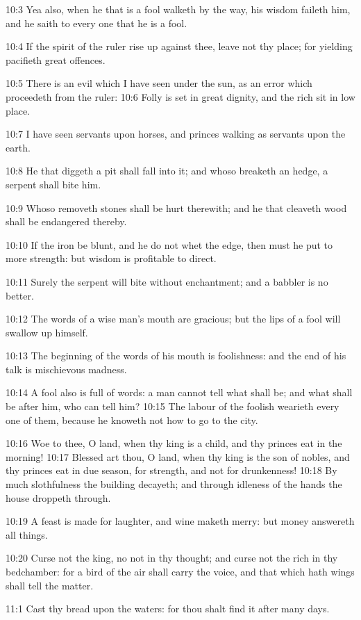 10:3 Yea also, when he that is a fool walketh by the way, his wisdom faileth him, and he saith to every one that he is a fool.

10:4 If the spirit of the ruler rise up against thee, leave not thy place; for yielding pacifieth great offences.

10:5 There is an evil which I have seen under the sun, as an error which proceedeth from the ruler: 10:6 Folly is set in great dignity, and the rich sit in low place.

10:7 I have seen servants upon horses, and princes walking as servants upon the earth.

10:8 He that diggeth a pit shall fall into it; and whoso breaketh an hedge, a serpent shall bite him.

10:9 Whoso removeth stones shall be hurt therewith; and he that cleaveth wood shall be endangered thereby.

10:10 If the iron be blunt, and he do not whet the edge, then must he put to more strength: but wisdom is profitable to direct.

10:11 Surely the serpent will bite without enchantment; and a babbler is no better.

10:12 The words of a wise man's mouth are gracious; but the lips of a fool will swallow up himself.

10:13 The beginning of the words of his mouth is foolishness: and the end of his talk is mischievous madness.

10:14 A fool also is full of words: a man cannot tell what shall be; and what shall be after him, who can tell him?  10:15 The labour of the foolish wearieth every one of them, because he knoweth not how to go to the city.

10:16 Woe to thee, O land, when thy king is a child, and thy princes eat in the morning!  10:17 Blessed art thou, O land, when thy king is the son of nobles, and thy princes eat in due season, for strength, and not for drunkenness!  10:18 By much slothfulness the building decayeth; and through idleness of the hands the house droppeth through.

10:19 A feast is made for laughter, and wine maketh merry: but money answereth all things.

10:20 Curse not the king, no not in thy thought; and curse not the rich in thy bedchamber: for a bird of the air shall carry the voice, and that which hath wings shall tell the matter.

11:1 Cast thy bread upon the waters: for thou shalt find it after many days.

